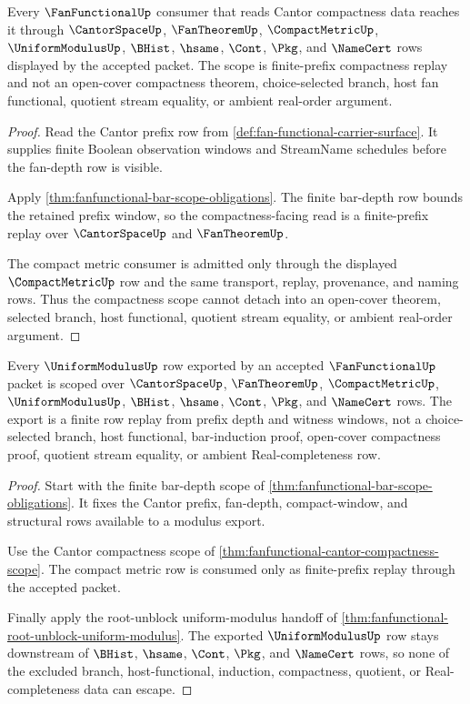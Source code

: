 \begin{theorem}
\label{thm:fanfunctional-cantor-compactness-scope}
Every $\FanFunctionalUp$ consumer that reads Cantor compactness data reaches it through $\CantorSpaceUp$, $\FanTheoremUp$, $\CompactMetricUp$, $\UniformModulusUp$, $\BHist$, $\hsame$, $\Cont$, $\Pkg$, and $\NameCert$ rows displayed by the accepted packet. The scope is finite-prefix compactness replay and not an open-cover compactness theorem, choice-selected branch, host fan functional, quotient stream equality, or ambient real-order argument.
\end{theorem}
\begin{proof}
Read the Cantor prefix row from \autoref{def:fan-functional-carrier-surface}. It supplies finite Boolean observation windows and StreamName schedules before the fan-depth row is visible.

Apply \autoref{thm:fanfunctional-bar-scope-obligations}. The finite bar-depth row bounds the retained prefix window, so the compactness-facing read is a finite-prefix replay over $\CantorSpaceUp$ and $\FanTheoremUp$.

The compact metric consumer is admitted only through the displayed $\CompactMetricUp$ row and the same transport, replay, provenance, and naming rows. Thus the compactness scope cannot detach into an open-cover theorem, selected branch, host functional, quotient stream equality, or ambient real-order argument.
\end{proof}

\begin{theorem}
\label{thm:fanfunctional-uniform-modulus-scope}
Every $\UniformModulusUp$ row exported by an accepted $\FanFunctionalUp$ packet is scoped over $\CantorSpaceUp$, $\FanTheoremUp$, $\CompactMetricUp$, $\UniformModulusUp$, $\BHist$, $\hsame$, $\Cont$, $\Pkg$, and $\NameCert$ rows. The export is a finite row replay from prefix depth and witness windows, not a choice-selected branch, host functional, bar-induction proof, open-cover compactness proof, quotient stream equality, or ambient Real-completeness row.
\end{theorem}
\begin{proof}
Start with the finite bar-depth scope of \autoref{thm:fanfunctional-bar-scope-obligations}. It fixes the Cantor prefix, fan-depth, compact-window, and structural rows available to a modulus export.

Use the Cantor compactness scope of \autoref{thm:fanfunctional-cantor-compactness-scope}. The compact metric row is consumed only as finite-prefix replay through the accepted packet.

Finally apply the root-unblock uniform-modulus handoff of \autoref{thm:fanfunctional-root-unblock-uniform-modulus}. The exported $\UniformModulusUp$ row stays downstream of $\BHist$, $\hsame$, $\Cont$, $\Pkg$, and $\NameCert$ rows, so none of the excluded branch, host-functional, induction, compactness, quotient, or Real-completeness data can escape.
\end{proof}
